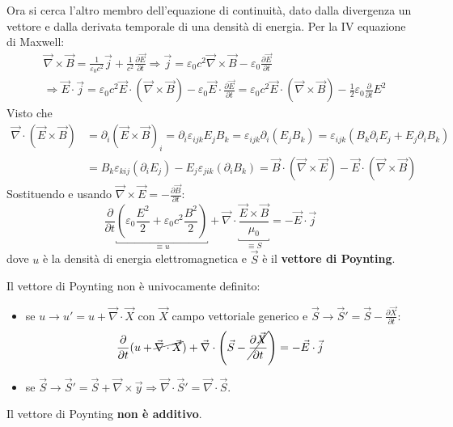 \documentclass[10pt, a4paper]{scrartcl}
\numberwithin{equation}{subsection}
\theoremstyle{style1}
\begin{document}
Ora si cerca l'altro membro dell'equazione di continuit\`a, dato dalla divergenza un vettore e dalla derivata temporale di una densit\`a di energia. Per la IV equazione di Maxwell:
\[
\begin{split}
	&\vec{\nabla }\times \vec{B}= \frac{1}{\varepsilon _0c^2}\vec{j}+\frac{1}{c^2} \frac{\partial \vec{E}}{\partial t} \Rightarrow \vec{j} = \varepsilon _0 c^2 \vec{\nabla }\times \vec{B}-\varepsilon _0 \frac{\partial \vec{E}}{\partial t} \\
	&\Rightarrow \vec{E}\cdot \vec{j}= \varepsilon _0 c^2 \vec{E}\cdot (\vec{\nabla }\times \vec{B}) - \varepsilon _0 \vec{E}\cdot \frac{\partial \vec{E}}{\partial t} = \varepsilon _0 c^2 \vec{E}\cdot (\vec{\nabla }\times \vec{B}) - \frac{1}{2}\varepsilon _0 \frac{\partial }{\partial t} E^2 
\end{split}
\] 
Visto che
\[
	\begin{split}
		\vec{\nabla }\cdot (\vec{E}\times \vec{B}) &= \partial _i (\vec{E}\times \vec{B})_i = \partial _i \varepsilon _{ijk} E_jB_k = \varepsilon _{ijk} \partial _i(E_jB_k)= \varepsilon _{ijk} (B_k \partial _i E_j + E_j \partial _i B_k)\\
							   &= B_k \varepsilon _{kij} (\partial _iE_j) - E_j \varepsilon _{jik} (\partial _iB_k) = \vec{B}\cdot (\vec{\nabla }\times \vec{E}) - \vec{E}\cdot (\vec{\nabla }\times \vec{B})
	\end{split}
\] 
Sostituendo e usando $\vec{\nabla }\times \vec{E}=- \frac{\partial \vec{B}}{\partial t} $:
\begin{equation}
	\frac{\partial }{\partial t} \underbracket{\left(\varepsilon _0 \frac{E^2}{2}+ \varepsilon _0 c^2 \frac{B^2}{2}\right)}_{\equiv u}  +\vec{\nabla }\cdot \underbracket{\frac{\vec{E}\times \vec{B}}{\mu_0}}_{\equiv S} = - \vec{E}\cdot \vec{j}
\end{equation}
dove $u$ \`e la densit\`a di energia elettromagnetica e $\vec{S}$ \`e il \textbf{vettore di Poynting}. 

Il vettore di Poynting non \`e univocamente definito:
\begin{itemize}
	\item se $u\to u' = u +\vec{\nabla }\cdot \vec{X}$ con $\vec{X}$ campo vettoriale generico e $\vec{S}\to \vec{S}' = \vec{S} - \frac{\partial \vec{X}}{\partial t} $:
		\[
			\frac{\partial }{\partial t} (u+ \cancel{\vec{\nabla }\cdot \vec{X}}) + \vec{\nabla }\cdot \left(\vec{S}-\cancel{\frac{\partial \vec{X}}{\partial t} } \right) = -\vec{E}\cdot \vec{j}
		\] 
	\item se $\vec{S}\to \vec{S}' = \vec{S}+ \vec{\nabla }\times \vec{y}\Rightarrow \vec{\nabla }\cdot \vec{S}' = \vec{\nabla }\cdot \vec{S}$.
\end{itemize}
Il vettore di Poynting \textbf{non \`e additivo}.
\end{document}
